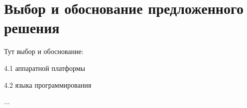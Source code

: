 \section{Выбор и обоснование предложенного решения}

Тут выбор и обоснование:

\begin{itemize*}
\item 4.1 аппаратной платформы
\item 4.2 языка программирования
\item ... 
\end{itemize*}
